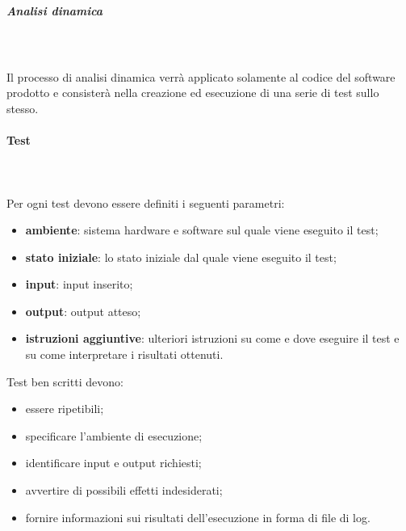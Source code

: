 			\subparagraph{Analisi dinamica} \mbox{}\\ \mbox{}\\
			Il processo di analisi dinamica verrà applicato solamente al codice del software prodotto e consisterà nella creazione ed esecuzione di una serie di test sullo stesso. 
			
		\paragraph{Test} \mbox{}\\ \mbox{}\\
		Per ogni test devono essere definiti i seguenti parametri:
		\begin{itemize}
			\item \textbf{ambiente}: sistema hardware e software sul quale viene eseguito il test;
			\item \textbf{stato iniziale}: lo stato iniziale dal quale  viene eseguito il test;
			\item \textbf{input}: input inserito;
			\item \textbf{output}: output atteso;
			\item \textbf{istruzioni aggiuntive}: ulteriori istruzioni su come e dove eseguire il test e su come interpretare i risultati ottenuti.
		\end{itemize}
		Test ben scritti devono:
		\begin{itemize}
			\item essere ripetibili;
			\item specificare l'ambiente di esecuzione;
			\item identificare input e output richiesti;
			\item avvertire di possibili effetti indesiderati;
			\item fornire informazioni sui risultati dell'esecuzione in forma di file di log.
		\end{itemize}	
			
